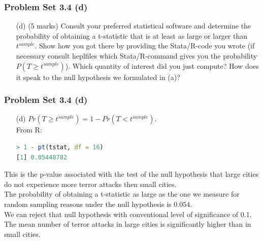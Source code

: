 \documentclass[xcolor=table]{beamer}
\begin{document}

\begin{frame}
\frametitle{Problem Set 3.4 (d)}
\begin{itemize}
\item[(d)] (5 marks) Consult your preferred statistical software and determine the probability of obtaining a t-statistic that is at least as large or larger than $t^{sample}$. Show how you got there by providing the Stata/R-code you wrote (if necessary consult heplfiles which Stata/R-command gives you the probability $P(T\geq t^{sample})$). Which quantity of interest did you just compute? How does it speak to the null hypothesis we formulated in (a)?\\ 
\end{itemize}
\end{frame}


\begin{frame}[fragile]
\frametitle{Problem Set 3.4 (d)}
\begin{itemize}
\item[(d)] $Pr(T\geq t^{sample}) = 1 - Pr(T<t^{sample})$. 
\\ From R:
\begin{lstlisting}[language = R]
> 1 - pt(tstat, df = 16)
[1] 0.05448782
\end{lstlisting}
\end{itemize}

This is the p-value associated with the test of the null hypothesis that large cities do not experience more terror attacks then small cities. \\
The probability of obtaining a t-statistic as large as the one we measure for random sampling reasons under the null hypothesis is $0.054$. \\
We can reject that null hypothesis with conventional level of significance of $0.1$. The mean number of terror attacks in large cities is significantly higher than in small cities. 
\end{frame}
\end{document}

